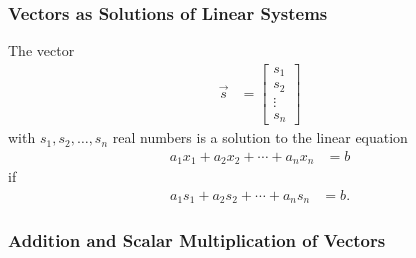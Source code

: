 %
%
%
%

\subsubsection{Vectors as Solutions of Linear Systems} 

The vector 
%
\begin{align*}
\vec{s} & = \begin{bmatrix}
s_1 \\ s_2 \\ \vdots \\ s_n
\end{bmatrix}
\end{align*} with $s_1, s_2, \ldots, s_n$ real numbers 
is a solution to the linear equation 
%
\begin{align*}
a_1 x_1 + a_2 x_2 + \cdots + a_n x_n & = b
\end{align*}
if
\begin{align*}
a_1 s_1 + a_2 s_2 + \cdots + a_n s_n & = b. 
\end{align*}

\subsubsection{Addition and Scalar Multiplication of Vectors} 

